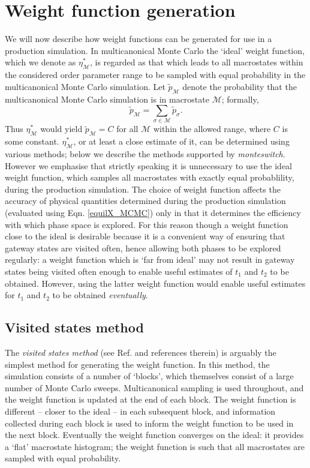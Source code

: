\documentclass{report}
\begin{document}
\section{Weight function generation}\label{sec:weight_generation}
We will now describe how weight functions can be generated for use in a production simulation.
In multicanonical Monte Carlo the `ideal' weight function, which we denote as $\eta_{\mathcal{M}}^*$, is regarded as that which leads to 
all macrostates within the considered order parameter range to be sampled with equal probability in the multicanonical Monte Carlo simulation.
Let $\tilde{p}_{\mathcal{M}}$ denote the probability that the multicanonical Monte Carlo simulation is in macrostate $\mathcal{M}$; formally,
\begin{equation}
\tilde{p}_{\mathcal{M}}=\sum_{\sigma\in\mathcal{M}}\tilde{p}_{\sigma}.
\end{equation}
Thus $\eta_{\mathcal{M}}^*$ would yield $\tilde{p}_{\mathcal{M}}=C$ for all $\mathcal{M}$ within the allowed range, where $C$ is some constant.
$\eta^*_{\mathcal{M}}$, or at least a close estimate of it, can be determined using various methods; below we 
describe the methods supported by \emph{monteswitch}. 
However we emphasise that strictly speaking it is unnecessary to use the ideal weight function, which samples all macrostates with exactly equal 
probablility, during the
production simulation. The choice of weight function affects the accuracy of physical quantities determined during the production simulation
(evaluated using Eqn. \eqref{equilX_MCMC}) only in that it determines the efficiency with which phase space is explored. For this reason though a
weight function close to the ideal is desirable because it is a convenient way of ensuring that gateway states are visited often, hence 
allowing both phases to be explored regularly: a weight function which is `far from ideal' may not result in gateway states being visited often
enough to enable useful estimates of $t_1$ and $t_2$ to be obtained. However, using the latter weight function would enable useful estimates 
for $t_1$ and $t_2$ to be obtained \emph{eventually}.

\subsection{Visited states method}\label{sec:visited_states}
The \emph{visited states method} (see Ref. \cite{Smith_1995} and references therein) is arguably the simplest method for generating the weight function. 
In this method, the simulation consists of a number of
`blocks', which themselves consist of a large number of Monte Carlo sweeps. Multicanonical sampling is used throughout, and the weight function is updated at
the end of each block. The weight function is different -- closer to the ideal -- in each subsequent block, and information
collected during each block is used to inform the weight function to be used in the next block. Eventually the weight function converges on the 
ideal: it provides a `flat' macrostate histogram; the weight function is such that all macrostates are sampled with equal probability.
\end{document}
